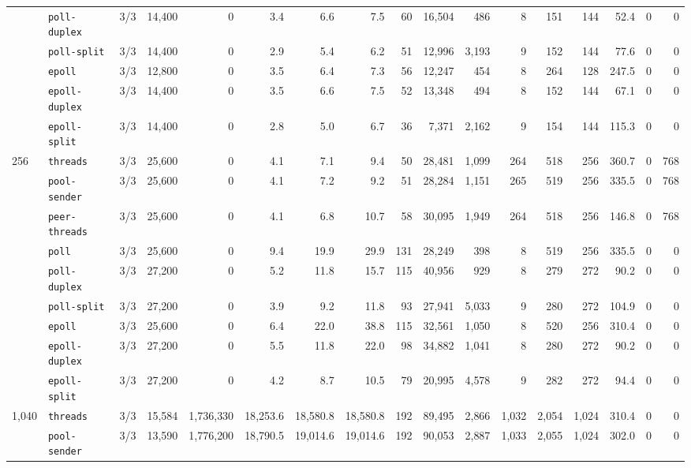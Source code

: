 \begin{longtable}{@{}llrrrrrrrrrrrrrrr@{}}
 & \texttt{poll-duplex} & 3/3 & 14{,}400 & 0 & 3.4 & 6.6 & 7.5 & 60 & 16{,}504 & 486 & 8 & 151 & 144 & 52.4 & 0 & 0 \\
 & \texttt{poll-split} & 3/3 & 14{,}400 & 0 & 2.9 & 5.4 & 6.2 & 51 & 12{,}996 & 3{,}193 & 9 & 152 & 144 & 77.6 & 0 & 0 \\
 & \texttt{epoll} & 3/3 & 12{,}800 & 0 & 3.5 & 6.4 & 7.3 & 56 & 12{,}247 & 454 & 8 & 264 & 128 & 247.5 & 0 & 0 \\
 & \texttt{epoll-duplex} & 3/3 & 14{,}400 & 0 & 3.5 & 6.6 & 7.5 & 52 & 13{,}348 & 494 & 8 & 152 & 144 & 67.1 & 0 & 0 \\
 & \texttt{epoll-split} & 3/3 & 14{,}400 & 0 & 2.8 & 5.0 & 6.7 & 36 & 7{,}371 & 2{,}162 & 9 & 154 & 144 & 115.3 & 0 & 0 \\
\midrule
256 & \texttt{threads} & 3/3 & 25{,}600 & 0 & 4.1 & 7.1 & 9.4 & 50 & 28{,}481 & 1{,}099 & 264 & 518 & 256 & 360.7 & 0 & 768 \\
 & \texttt{pool-sender} & 3/3 & 25{,}600 & 0 & 4.1 & 7.2 & 9.2 & 51 & 28{,}284 & 1{,}151 & 265 & 519 & 256 & 335.5 & 0 & 768 \\
 & \texttt{peer-threads} & 3/3 & 25{,}600 & 0 & 4.1 & 6.8 & 10.7 & 58 & 30{,}095 & 1{,}949 & 264 & 518 & 256 & 146.8 & 0 & 768 \\
 & \texttt{poll} & 3/3 & 25{,}600 & 0 & 9.4 & 19.9 & 29.9 & 131 & 28{,}249 & 398 & 8 & 519 & 256 & 335.5 & 0 & 0 \\
 & \texttt{poll-duplex} & 3/3 & 27{,}200 & 0 & 5.2 & 11.8 & 15.7 & 115 & 40{,}956 & 929 & 8 & 279 & 272 & 90.2 & 0 & 0 \\
 & \texttt{poll-split} & 3/3 & 27{,}200 & 0 & 3.9 & 9.2 & 11.8 & 93 & 27{,}941 & 5{,}033 & 9 & 280 & 272 & 104.9 & 0 & 0 \\
 & \texttt{epoll} & 3/3 & 25{,}600 & 0 & 6.4 & 22.0 & 38.8 & 115 & 32{,}561 & 1{,}050 & 8 & 520 & 256 & 310.4 & 0 & 0 \\
 & \texttt{epoll-duplex} & 3/3 & 27{,}200 & 0 & 5.5 & 11.8 & 22.0 & 98 & 34{,}882 & 1{,}041 & 8 & 280 & 272 & 90.2 & 0 & 0 \\
 & \texttt{epoll-split} & 3/3 & 27{,}200 & 0 & 4.2 & 8.7 & 10.5 & 79 & 20{,}995 & 4{,}578 & 9 & 282 & 272 & 94.4 & 0 & 0 \\
\midrule
1{,}040 & \texttt{threads} & 3/3 & 15{,}584 & 1{,}736{,}330 & 18{,}253.6 & 18{,}580.8 & 18{,}580.8 & 192 & 89{,}495 & 2{,}866 & 1{,}032 & 2{,}054 & 1{,}024 & 310.4 & 0 & 0 \\
 & \texttt{pool-sender} & 3/3 & 13{,}590 & 1{,}776{,}200 & 18{,}790.5 & 19{,}014.6 & 19{,}014.6 & 192 & 90{,}053 & 2{,}887 & 1{,}033 & 2{,}055 & 1{,}024 & 302.0 & 0 & 0 \\

\end{longtable}
